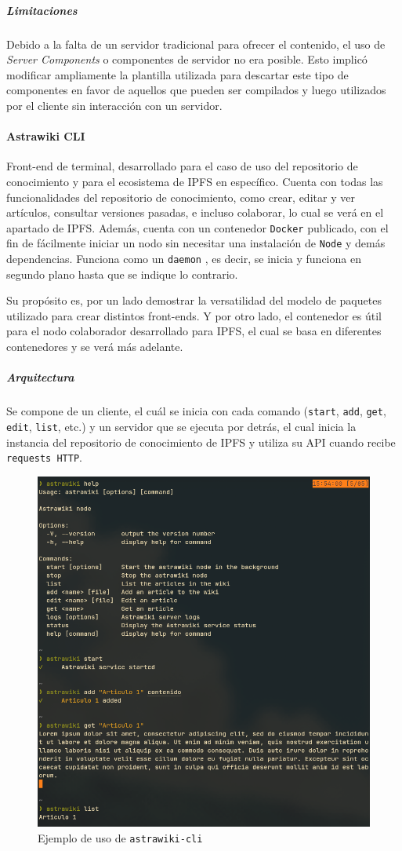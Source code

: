\subparagraph{Limitaciones} Debido a la falta de un servidor tradicional para ofrecer el contenido, el uso de \textit{Server Components} o componentes de servidor \cite{server-components} no era posible. Esto implicó modificar ampliamente la plantilla utilizada para descartar este tipo de componentes en favor de aquellos que pueden ser compilados y luego utilizados por el cliente sin interacción con un servidor.

\paragraph{Astrawiki CLI}

Front-end de terminal, desarrollado para el caso de uso del repositorio de conocimiento y para el ecosistema de IPFS en específico. Cuenta con todas las funcionalidades del repositorio de conocimiento, como crear, editar y ver artículos, consultar versiones pasadas, e incluso colaborar, lo cual se verá en el apartado de IPFS. Además, cuenta con un contenedor \texttt{Docker} publicado, con el fin de fácilmente iniciar un nodo sin necesitar una instalación de \texttt{Node} y demás dependencias. Funciona como un \texttt{daemon} \cite{daemon}, es decir, se inicia y funciona en segundo plano hasta que se indique lo contrario.

Su propósito es, por un lado demostrar la versatilidad del modelo de paquetes utilizado para crear distintos front-ends. Y por otro lado, el contenedor es útil para el nodo colaborador desarrollado para IPFS, el cual se basa en diferentes contenedores y se verá más adelante.

\subparagraph{Arquitectura} Se compone de un cliente, el cuál se inicia con cada comando (\texttt{start}, \texttt{add}, \texttt{get}, \texttt{edit}, \texttt{list}, etc.) y un servidor que se ejecuta por detrás, el cual inicia la instancia del repositorio de conocimiento de IPFS y utiliza su API cuando recibe \texttt{requests HTTP}.

\begin{figure}[H]
    \centering
    \includegraphics[width=0.7\linewidth]{img/astrawiki-cli.png}
    \caption{Ejemplo de uso de \texttt{astrawiki-cli}}
    \label{fig:astrawiki-cli}
\end{figure}

